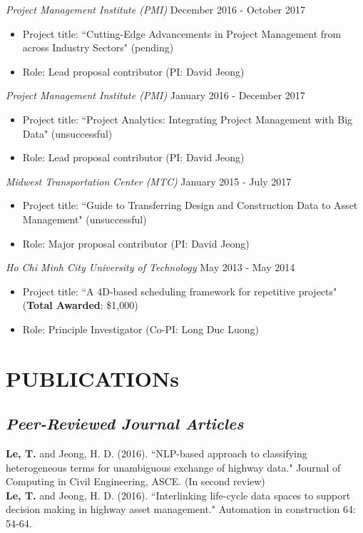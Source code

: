 \documentclass[11pt]{article}
\begin{document}
{\sl Project Management Institute (PMI)} \hfill December 2016 - October 2017
\begin{itemize}
\item Project title: ``Cutting-Edge Advancements in Project Management from across Industry Sectors" (pending)
\item Role: Lead proposal contributor (PI: David Jeong)
\end{itemize}

{\sl Project Management Institute (PMI)} \hfill January 2016 -  December 2017
\begin{itemize}
\item Project title: ``Project Analytics: Integrating Project Management with Big Data" (unsuccessful)
\item Role: Lead proposal contributor (PI: David Jeong)
\end{itemize}

{\sl Midwest Transportation Center (MTC)} \hfill January 2015 - July 2017
\begin{itemize} 
\item Project title: ``Guide to Transferring Design and Construction Data to Asset Management" (unsuccessful)
\item Role: Major proposal contributor (PI: David Jeong)
\end{itemize}

{\sl Ho Chi Minh City University of Technology } \hfill May 2013 - May 2014
\begin{itemize}
\item Project title: ``A 4D-based scheduling framework for repetitive projects" ({\bf Total Awarded}: \$1,000)
\item Role: Principle Investigator (Co-PI: Long Duc Luong)
\end{itemize}
\section*{PUBLICATIONs}

\subsection*{\sl Peer-Reviewed Journal Articles}
{\bf Le, T.} and Jeong, H. D. (2016). ``NLP-based approach to classifying heterogeneous terms for unambiguous exchange of highway data." Journal of Computing in Civil Engineering, ASCE. (In second review)\\
{\bf Le, T.} and Jeong, H. D. (2016). ``Interlinking life-cycle data spaces to support decision making in highway asset management." Automation in construction 64: 54-64.
\end{document}

